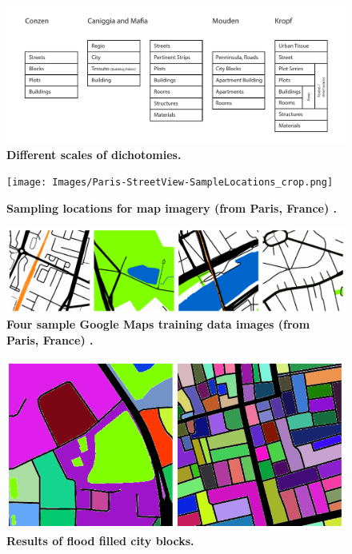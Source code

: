 \documentclass{article}
\begin{document}
\begin{figure}
\centering    
\includegraphics[scale=0.80,page=1]{Images/Typology_Dichtomies.pdf}  
\caption{\bf Different scales of dichotomies. }    
 \label{fig:TypologyDichtomies}  
\end{figure} 

\begin{figure}
    \centering    
\texttt{[image: Images/Paris-StreetView-SampleLocations\_crop.png]}  
\caption{\bf Sampling locations for map imagery (from Paris, France) \cite{GoogleStatic2017}.}    
 \label{fig:parissample}  
\end{figure} 


\begin{figure}
    \centering  
 \includegraphics[scale=0.8]{Images/SampleTraining.png}     
\caption{\bf Four sample Google Maps training data images (from Paris, France) \cite{GoogleStatic2017}.}    
 \label{fig:maps}  
\end{figure} 

\begin{figure}
    \centering    
\includegraphics[scale=0.8]{Images/FloodSample.png}     
\caption{\bf Results of flood filled city blocks.}    
 \label{fig:floodfilled}  
\end{figure} 
\end{document}
